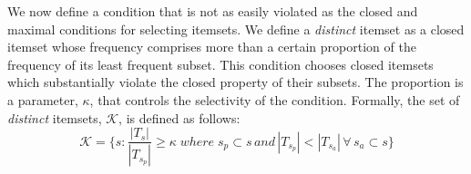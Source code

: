 \documentclass{sig-alternate}
\begin{document}
We now define a condition that is not as easily violated as the closed and maximal conditions for selecting itemsets.
We define a \emph{distinct} itemset as a closed itemset whose frequency comprises more than a certain proportion of the frequency of its least frequent subset. 
This condition chooses closed itemsets which substantially violate the closed property of their subsets. The proportion is a parameter, $\kappa$, that controls the selectivity of the condition. Formally, the set of \emph{distinct} itemsets, $\mathcal{K}$, is defined as follows:
\begin{equation*}\mathcal{K} = \{s:\frac{|T_{s}|}{|T_{s_{p}}|} \ge \kappa \; where \; s_{p} \subset s \, and \, |T_{s_{p}}| < |T_{s_{a}} |\, \forall \, s_{a} \subset s \}\end{equation*}
\end{document}
